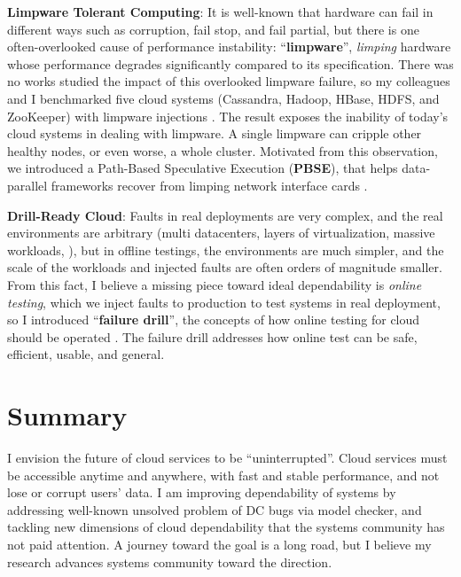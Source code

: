 \documentclass[10pt]{article}
\begin{document}
\noindent
\textbf{Limpware Tolerant Computing}: It is well-known that hardware can fail in
different ways such as corruption, fail stop, and fail partial, but there is one
often-overlooked cause of performance instability:
``\textbf{limpware}'', \textit{limping} hardware whose performance
degrades significantly compared to its specification. There was no works
studied the impact of this overlooked limpware failure, so my colleagues and I
benchmarked five cloud systems (Cassandra, Hadoop, HBase, HDFS, and ZooKeeper)
with limpware injections \cite{Do+13-Limplock}. The result exposes the inability
of today's cloud systems in dealing with limpware. A single limpware can cripple
other healthy nodes, or even worse, a whole cluster. Motivated from this
observation, we introduced a Path-Based Speculative Execution
(\textbf{PBSE}), that helps data-parallel frameworks recover from limping
network interface cards \cite{Suminto+17-PBSE-InPrep}.


\noindent
\textbf{Drill-Ready Cloud}: Faults in real deployments are very complex, and
the real environments are arbitrary (multi datacenters, layers of
virtualization, massive workloads, \etc), but in offline testings, the
environments are much simpler, and the scale of the workloads and injected
faults are often orders of magnitude smaller. From this fact, I believe a
missing piece toward ideal dependability is \textit{online testing}, which we
inject faults to production to test systems in real deployment, so I introduced
``\textbf{failure drill}'', the concepts of how online testing for cloud should
be operated \cite{Leesatapornwongsa+14-Drill-fixed}. The failure drill
addresses how online test can be safe, efficient, usable, and general.

\section{Summary}

I envision the future of cloud services to be ``uninterrupted''. Cloud services
must be accessible anytime and anywhere, with fast and stable performance, and
not lose or corrupt users' data.
%
I am improving dependability of systems by addressing well-known unsolved
problem of DC bugs via model checker, and tackling new dimensions of cloud
dependability that the systems community has not paid attention. A journey
toward the goal is a long road, but I believe my research advances systems
community toward the direction. 


\end{document}
